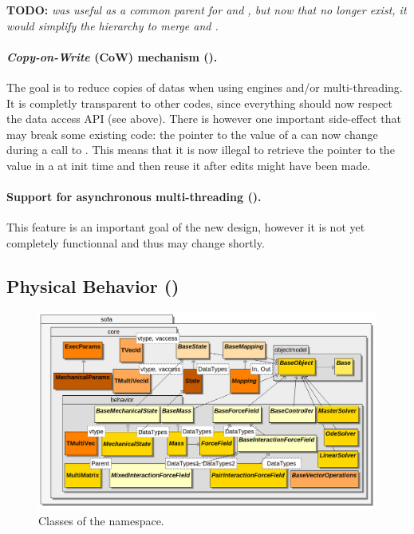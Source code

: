 \begin{itemize}
\begin{itemize}
\textbf{TODO:} \textit{ was useful as a common parent for  and , but now that  no longer exist, it would simplify the hierarchy to merge  and .}

\paragraph{\textit{Copy-on-Write} (CoW) mechanism ().}
The goal is to reduce copies of datas when using engines and/or multi-threading.
It is completly transparent to other codes, since everything should now respect the data access API (see above).
There is however one important side-effect that may break some existing code: the pointer to the value of a  can now change during a call to .
This means that it is now illegal to retrieve the pointer to the value in a  at init time and then reuse it after edits might have been made.

\paragraph{Support for asynchronous multi-threading ().}
This feature is an important goal of the new design, however it is not yet completely functionnal and thus may change shortly.


\subsection{Physical Behavior ()}
\begin{figure}[h]
\centering
\includegraphics[scale=.33]{../classdiagrams/sofacore-behavior.png}
\caption{Classes of the  namespace.}
\label{fig:uml-sofa-core-behavior}
\end{figure}


\end{itemize}
\end{itemize}
